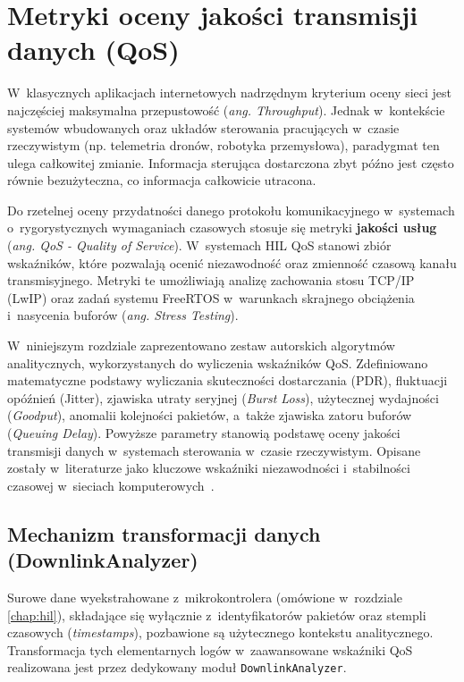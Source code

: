 \chapter{Metryki oceny jakości transmisji danych (QoS)}
\label{chap:qos}

W~klasycznych aplikacjach internetowych nadrzędnym kryterium oceny sieci jest najczęściej maksymalna przepustowość (\textit{ang. Throughput}).
Jednak w~kontekście systemów wbudowanych oraz układów sterowania pracujących w~czasie rzeczywistym (np. telemetria dronów, robotyka przemysłowa), paradygmat ten ulega całkowitej zmianie.
Informacja sterująca dostarczona zbyt późno jest często równie bezużyteczna, co informacja całkowicie utracona.

Do rzetelnej oceny przydatności danego protokołu komunikacyjnego w~systemach o~rygorystycznych wymaganiach czasowych stosuje się metryki \textbf{jakości usług} (\textit{ang. QoS - Quality of Service}).
W~systemach HIL QoS stanowi zbiór wskaźników, które pozwalają ocenić niezawodność oraz zmienność czasową kanału transmisyjnego.
Metryki te umożliwiają analizę zachowania stosu TCP/IP (LwIP) oraz zadań systemu FreeRTOS w~warunkach skrajnego obciążenia i~nasycenia buforów (\textit{ang. Stress Testing}).

W~niniejszym rozdziale zaprezentowano zestaw autorskich algorytmów analitycznych, wykorzystanych do wyliczenia wskaźników QoS.
Zdefiniowano matematyczne podstawy wyliczania skuteczności dostarczania (PDR), fluktuacji opóźnień (Jitter), zjawiska utraty seryjnej (\textit{Burst Loss}), użytecznej wydajności (\textit{Goodput}), anomalii kolejności pakietów, a~także zjawiska zatoru buforów (\textit{Queuing Delay}).
Powyższe parametry stanowią podstawę oceny jakości transmisji danych w~systemach sterowania w~czasie rzeczywistym.
Opisane zostały w~literaturze jako kluczowe wskaźniki niezawodności i~stabilności czasowej w~sieciach komputerowych~\cite{kurose_global}.

\section{Mechanizm transformacji danych (DownlinkAnalyzer)}
\label{sec:qos_downlink_analyzer}

Surowe dane wyekstrahowane z~mikrokontrolera (omówione w~rozdziale \ref{chap:hil}), składające się wyłącznie z~identyfikatorów pakietów oraz stempli czasowych (\textit{timestamps}), pozbawione są użytecznego kontekstu analitycznego.
Transformacja tych elementarnych logów w~zaawansowane wskaźniki QoS realizowana jest przez dedykowany moduł \texttt{DownlinkAnalyzer}.


